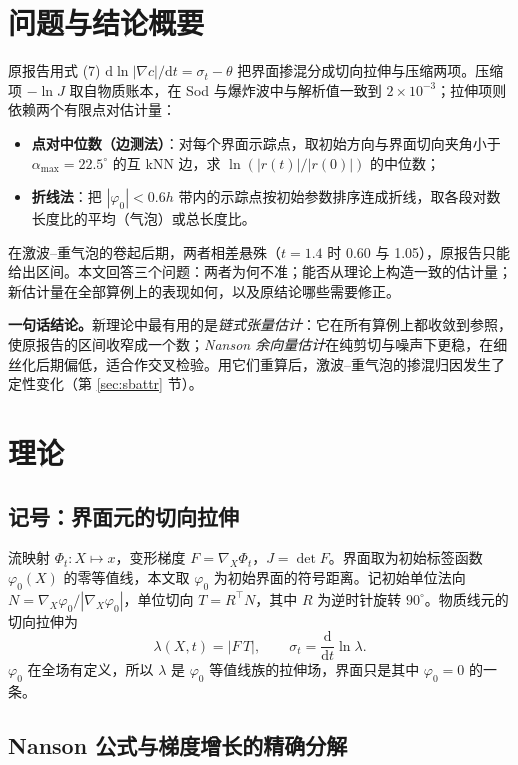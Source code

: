 \documentclass[10.5pt,a4paper]{article}
\theoremstyle{plain}
\newcommand{\dd}{\mathrm{d}}
\begin{document}
\tableofcontents
\newpage

\section{问题与结论概要}

原报告用式 (7) $\dd\ln|\nabla c|/\dd t=\sigma_t-\theta$ 把界面掺混分成切向拉伸与压缩两项。压缩项 $-\ln J$ 取自物质账本，在 Sod 与爆炸波中与解析值一致到 $2\times10^{-3}$；拉伸项则依赖两个有限点对估计量：
\begin{itemize}
\item \textbf{点对中位数（边测法）}：对每个界面示踪点，取初始方向与界面切向夹角小于 $\alpha_{\max}=22.5^\circ$ 的互 kNN 边，求 $\ln(|r(t)|/|r(0)|)$ 的中位数；
\item \textbf{折线法}：把 $|\varphi_0|<0.6h$ 带内的示踪点按初始参数排序连成折线，取各段对数长度比的平均（气泡）或总长度比。
\end{itemize}
在激波–重气泡的卷起后期，两者相差悬殊（$t=1.4$ 时 0.60 与 1.05），原报告只能给出区间。本文回答三个问题：两者为何不准；能否从理论上构造一致的估计量；新估计量在全部算例上的表现如何，以及原结论哪些需要修正。

\textbf{一句话结论。}新理论中最有用的是\emph{链式张量估计}：它在所有算例上都收敛到参照，使原报告的区间收窄成一个数；\emph{Nanson 余向量估计}在纯剪切与噪声下更稳，在细丝化后期偏低，适合作交叉检验。用它们重算后，激波–重气泡的掺混归因发生了定性变化（第 \ref{sec:sbattr} 节）。

\section{理论}\label{sec:theory}

\subsection{记号：界面元的切向拉伸}
流映射 $\Phi_t:X\mapsto x$，变形梯度 $F=\nabla_X\Phi_t$，$J=\det F$。界面取为初始标签函数 $\varphi_0(X)$ 的零等值线，本文取 $\varphi_0$ 为初始界面的符号距离。记初始单位法向 $N=\nabla_X\varphi_0/|\nabla_X\varphi_0|$，单位切向 $T=R^\top N$，其中 $R$ 为逆时针旋转 $90^\circ$。物质线元的切向拉伸为
\begin{equation}
\lambda(X,t)=|F\,T|,\qquad \sigma_t=\frac{\dd}{\dd t}\ln\lambda .
\end{equation}
$\varphi_0$ 在全场有定义，所以 $\lambda$ 是 $\varphi_0$ 等值线族的拉伸场，界面只是其中 $\varphi_0=0$ 的一条。

\subsection{Nanson 公式与梯度增长的精确分解}
\end{document}
